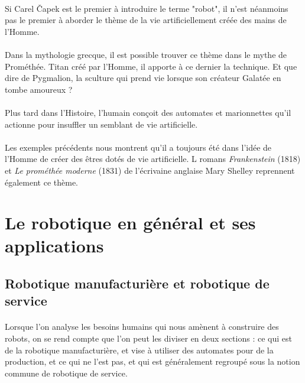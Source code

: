 \documentclass[a4paper,10pt]{article}
\begin{document}
            \paragraph{}
                Si Carel Čapek est le premier à introduire le terme "robot", il n'est néanmoins pas le 
                premier à aborder le thème de la vie artificiellement créée des mains de l'Homme.  
                
            \paragraph{} 
                Dans la mythologie grecque, il est possible trouver ce thème dans le 
                mythe de Prométhée. Titan créé par l'Homme, il apporte à ce dernier la 
                technique. Et que dire de Pygmalion, la sculture qui prend vie lorsque 
                son créateur Galatée en tombe amoureux ? 
                
            \paragraph{}
                Plus tard dans l'Histoire, l'humain conçoit des automates et 
                marionnettes qu'il actionne pour insuffler un semblant de vie
                artificielle. 
            
            \paragraph{}
                Les exemples précédents nous montrent qu'il a toujours été 
                dans l'idée de l'Homme de créer des êtres dotés de vie artificielle. 
                L romans \textit{Frankenstein} (1818) et \textit{Le prométhée moderne} (1831)
                de l'écrivaine anglaise Mary Shelley  reprennent également 
                ce thème. 
            
                
            
    \section{Le robotique en général et ses applications}
        \subsection{Robotique manufacturière et robotique de service}
            \paragraph{}
                Lorsque l'on analyse les besoins humains qui nous amènent à 
                construire des robots, on se rend compte que l'on peut les 
                diviser en deux sections : ce qui est de la robotique manufacturière, 
                et vise à utiliser des automates pour de la production, et ce qui ne 
                l'est pas, et qui est généralement regroupé sous la notion commune de 
                robotique de service. 
                
\end{document}
